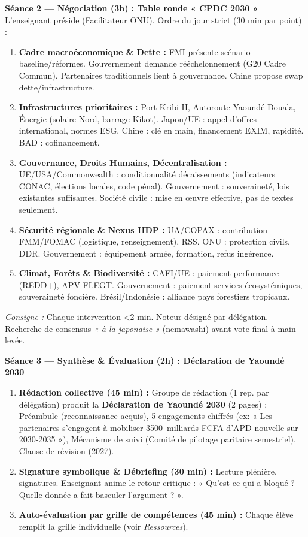 \documentclass[11pt]{article}
\begin{document}
\textbf{Séance 2 — Négociation (3h) : Table ronde « CPDC 2030 »}
L'enseignant préside (Facilitateur ONU). Ordre du jour strict (30 min par point) :
\begin{enumerate}
    \item \textbf{Cadre macroéconomique \& Dette :} FMI présente scénario baseline/réformes. Gouvernement demande rééchelonnement (G20 Cadre Commun). Partenaires traditionnels lient à gouvernance. Chine propose swap dette/infrastructure.
    \item \textbf{Infrastructures prioritaires :} Port Kribi II, Autoroute Yaoundé-Douala, Énergie (solaire Nord, barrage Kikot). Japon/UE : appel d'offres international, normes ESG. Chine : clé en main, financement EXIM, rapidité. BAD : cofinancement.
    \item \textbf{Gouvernance, Droits Humains, Décentralisation :} UE/USA/Commonwealth : conditionnalité décaissements (indicateurs CONAC, élections locales, code pénal). Gouvernement : souveraineté, lois existantes suffisantes. Société civile : mise en œuvre effective, pas de textes seulement.
    \item \textbf{Sécurité régionale \& Nexus HDP :} UA/COPAX : contribution FMM/FOMAC (logistique, renseignement), RSS. ONU : protection civils, DDR. Gouvernement : équipement armée, formation, refus ingérence.
    \item \textbf{Climat, Forêts \& Biodiversité :} CAFI/UE : paiement performance (REDD+), APV-FLEGT. Gouvernement : paiement services écosystémiques, souveraineté foncière. Brésil/Indonésie : alliance pays forestiers tropicaux.
\end{enumerate}
\textit{Consigne :} Chaque intervention \textless 2 min. Noteur désigné par délégation. Recherche de consensus \emph{« à la japonaise »} (nemawashi) avant vote final à main levée.

\textbf{Séance 3 — Synthèse \& Évaluation (2h) : Déclaration de Yaoundé 2030}
\begin{enumerate}
    \item \textbf{Rédaction collective (45 min) :} Groupe de rédaction (1 rep. par délégation) produit la \textbf{Déclaration de Yaoundé 2030} (2 pages) : Préambule (reconnaissance acquis), 5 engagements chiffrés (ex: « Les partenaires s'engagent à mobiliser \SI{3500}{milliards} FCFA d'APD nouvelle sur 2030-2035 »), Mécanisme de suivi (Comité de pilotage paritaire semestriel), Clause de révision (2027).
    \item \textbf{Signature symbolique \& Débriefing (30 min) :} Lecture plénière, signatures. Enseignant anime le retour critique : « Qu'est-ce qui a bloqué ? Quelle donnée a fait basculer l'argument ? ».
    \item \textbf{Auto-évaluation par grille de compétences (45 min) :} Chaque élève remplit la grille individuelle (voir \emph{Ressources}).
\end{enumerate}
\end{document}
